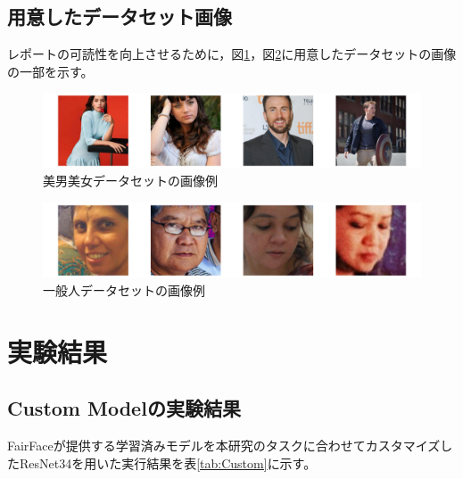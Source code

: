 \documentclass[a4paper,11pt,titlepage]{jsarticle}
\begin{document}
\subsection{用意したデータセット画像}
レポートの可読性を向上させるために，図\ref{fig:good_ex}，図\ref{fig:normal_ex}に用意したデータセットの画像の一部を示す。
\begin{figure}[htbp]
    \centering
    \includegraphics[width=1.1\textwidth]{ex_good_dataset.png}
    \caption{美男美女データセットの画像例}
    \label{fig:good_ex}
\end{figure}
\begin{figure}[H]
    \centering
    \includegraphics[width=1.1\textwidth]{ex_normal_dataset.png}
    \caption{一般人データセットの画像例}
    \label{fig:normal_ex}
\end{figure}



\section{実験結果}
\label{label:実験結果}
\subsection{Custom Modelの実験結果}
FairFaceが提供する学習済みモデルを本研究のタスクに合わせてカスタマイズしたResNet34を用いた実行結果を表\ref{tab:Custom}に示す。
\end{document}
